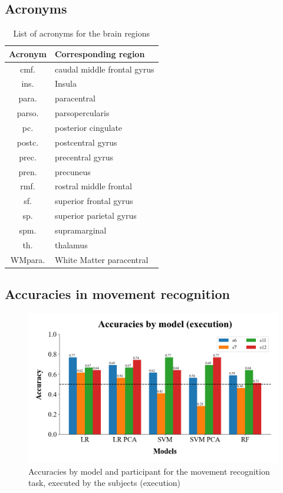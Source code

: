 \documentclass[10pt,conference,compsocconf]{IEEEtran}
\begin{document}
\subsection{Acronyms}
\begin{table}[h!]
    \centering
    \begin{tabular}{| c | l |}
        \hline
        Acronym & Corresponding region \\
        \hline
        cmf. & caudal middle frontal gyrus \\
        ins. & Insula \\
        para. & paracentral \\
        parso. & parsopercularis \\
        pc. & posterior cingulate \\
        postc. & postcentral gyrus \\
        prec. & precentral gyrus \\
	      pren. & precuneus \\
        rmf. & rostral middle frontal \\
        sf. & superior frontal gyrus \\
	      sp. & superior parietal gyrus \\
	      spm. & supramarginal \\
	      th. & thalamus \\
        WMpara. & White Matter paracentral \\
        \hline
    \end{tabular}
    \caption{List of acronyms for the brain regions}
    \label{tab:acronyms}
\end{table}

\subsection{Accuracies in movement recognition}
\begin{figure}[h!]
    \center
    \includegraphics[width=\linewidth]{../Code/figures/accuracies_across_part_ex.png}
    \caption{Accuracies by model and participant for the movement recognition task, executed by the subjects (execution)}
\end{figure}
\FloatBarrier
\end{document}
